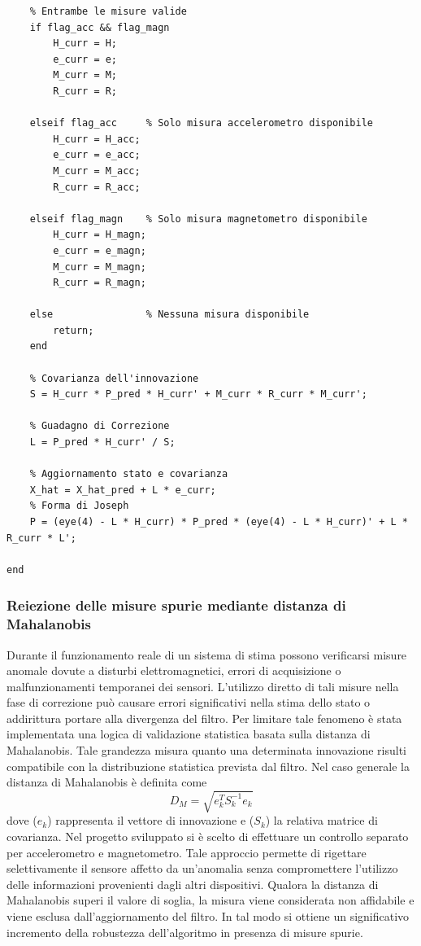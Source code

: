 \documentclass[12pt,a4paper]{article}
\begin{document}
\begin{lstlisting}[style=matlabstyle, caption={Blocco di correzione dell'EKF}, label={lst:correzione_ekf}]
    % Costruzione delle matrici in base alle misure valide
    % Entrambe le misure valide
    if flag_acc && flag_magn
        H_curr = H;
        e_curr = e;
        M_curr = M;
        R_curr = R;

    elseif flag_acc     % Solo misura accelerometro disponibile
        H_curr = H_acc;
        e_curr = e_acc;
        M_curr = M_acc;
        R_curr = R_acc;

    elseif flag_magn    % Solo misura magnetometro disponibile
        H_curr = H_magn;
        e_curr = e_magn;
        M_curr = M_magn;
        R_curr = R_magn;

    else                % Nessuna misura disponibile
        return;
    end

    % Covarianza dell'innovazione
    S = H_curr * P_pred * H_curr' + M_curr * R_curr * M_curr';

    % Guadagno di Correzione
    L = P_pred * H_curr' / S;
    
    % Aggiornamento stato e covarianza
    X_hat = X_hat_pred + L * e_curr;
    % Forma di Joseph
    P = (eye(4) - L * H_curr) * P_pred * (eye(4) - L * H_curr)' + L * R_curr * L';

end
\end{lstlisting}




\subsubsection{Reiezione delle misure spurie mediante distanza di Mahalanobis}
Durante il funzionamento reale di un sistema di stima possono verificarsi misure anomale dovute a disturbi elettromagnetici, errori di acquisizione o malfunzionamenti temporanei dei sensori. L'utilizzo diretto di tali misure nella fase di correzione può causare errori significativi nella stima dello stato o addirittura portare alla divergenza del filtro.
Per limitare tale fenomeno è stata implementata una logica di validazione statistica basata sulla distanza di Mahalanobis. Tale grandezza misura quanto una determinata innovazione risulti compatibile con la distribuzione statistica prevista dal filtro.
Nel caso generale la distanza di Mahalanobis è definita come
\begin{equation}
D_M=
\sqrt{
e_k^TS_k^{-1}e_k
}
\end{equation}
dove ($e_k$) rappresenta il vettore di innovazione e ($S_k$) la relativa matrice di covarianza.
Nel progetto sviluppato si è scelto di effettuare un controllo separato per accelerometro e magnetometro. Tale approccio permette di rigettare selettivamente il sensore affetto da un'anomalia senza compromettere l'utilizzo delle informazioni provenienti dagli altri dispositivi.
Qualora la distanza di Mahalanobis superi il valore di soglia, la misura viene considerata non affidabile e viene esclusa dall'aggiornamento del filtro. In tal modo si ottiene un significativo incremento della robustezza dell'algoritmo in presenza di misure spurie.
\end{document}
